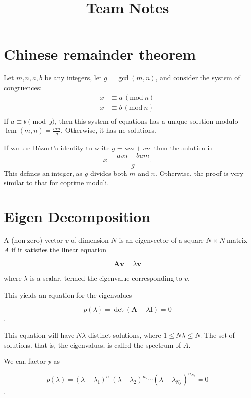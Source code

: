 \documentclass[11pt]{article}
\title{\vspace{-4ex}\Large{Team Notes}}
\author{}
\date{}
\newcommand{\Mod}[1]{\ (\mathrm{mod}\ #1)}
\begin{document}
\begin{multicols}{3}

\maketitle
\vspace{-13ex}
\tableofcontents
\pagestyle{fancy}



\section{Chinese remainder theorem}
Let $m,n,a,b$ be any integers, let $g=\gcd(m,n)$, and consider the system of congruences:
\begin{align*}
  x &\equiv a \Mod{n} \\
  x &\equiv b \Mod{n} \\
\end{align*}
If $a \equiv b{\pmod {g}}$, then this system of equations has a unique solution modulo $\operatorname{lcm} (m,n)= \frac{mn}{g}$. Otherwise, it has no solutions.

If we use Bézout's identity to write  $g=um+vn$, then the solution is
$${\displaystyle x={\frac {avn+bum}{g}}.}$$
This defines an integer, as $g$ divides both $m$ and $n$. Otherwise, the proof is very similar to that for coprime moduli.

\section{Eigen Decomposition}
A (non-zero) vector $v$ of dimension $N$ is an eigenvector of a square $N \times N$ matrix $A$ if it satisfies the linear equation

$$ \mathbf {A} \mathbf {v} =\lambda \mathbf {v} $$

where $\lambda$ is a scalar, termed the eigenvalue corresponding to $v$.

This yields an equation for the eigenvalues

$$p\left(\lambda \right)=\det \left(\mathbf {A} -\lambda \mathbf {I} \right)=0$$.

This equation will have $N\lambda$ distinct solutions, where $1 \leq N\lambda \leq N$. The set of solutions, that is, the eigenvalues, is called the spectrum of $A$.

We can factor $p$ as

$$p\left(\lambda \right)=\left(\lambda -\lambda _{1}\right)^{n_{1}}\left(\lambda -\lambda _{2}\right)^{n_{2}}\cdots \left(\lambda -\lambda _{N_{\lambda }}\right)^{n_{N_{\lambda }}}=0$$.


\end{multicols}
\end{document}
